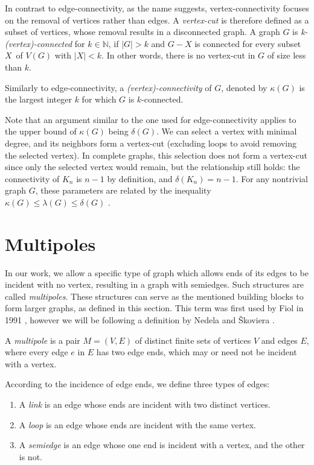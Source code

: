 \documentclass[12pt, twoside]{book}
\begin{document}
In contrast to edge-connectivity, as the name suggests, vertex-connectivity focuses on the removal of vertices rather than edges. A \textit{vertex-cut} is therefore defined as a subset of vertices, whose removal results in a disconnected graph. A graph $G$ is \textit{k-(vertex)-connected} for $k\in\mathbb{N}$, if $|G|>k$ and $G-X$ is connected for every subset $X$~of $V(G)$ with $|X|<k$. In other words, there is no vertex-cut in $G$ of size less than $k$.

Similarly to edge-connectivity, a \textit{(vertex)-connectivity} of $G$, denoted by $\kappa(G)$ is the largest integer $k$ for which $G$ is $k$-connected.

Note that an argument similar to the one used for edge-connectivity applies to the upper bound of $\kappa(G)$ being $\delta(G)$. We can select a vertex with minimal degree, and its neighbors form a vertex-cut (excluding loops to avoid removing the selected vertex). In complete graphs, this selection does not form a vertex-cut since only the selected vertex would remain, but the relationship still holds: the connectivity of $K_n$ is $n-1$ by definition, and $\delta(K_n)=n-1$. For any nontrivial graph $G$, these parameters are related by the inequality $\kappa(G)\leq \lambda(G) \leq \delta(G)$ \cite{Diestel}.

\section{Multipoles}\label{sec:multipoles}

In our work, we allow a specific type of graph which allows ends of its edges to be incident with no vertex, resulting in a graph with semiedges. Such structures are called \textit{multipoles}. These structures can serve as the mentioned building blocks to form larger graphs, as defined in this section. This term was first used by Fiol in 1991 \cite{Fiol1991}, however we will be following a definition by Nedela and Škoviera \cite{Nedela1996}.

\begin{definition}
	A \textit{multipole} is a pair $M=(V,E)$ of distinct finite sets of vertices $V$ and edges $E$, where every edge $e$ in $E$ has two edge ends, which may or need not be incident with a vertex.
	
	According to the incidence of edge ends, we define three types of edges:
	\begin{enumerate}[nolistsep]
		\item A \textit{link} is an edge whose ends are incident with two distinct vertices.
		\item A \textit{loop} is an edge whose ends are incident with the same vertex.
		\item A \textit{semiedge} is an edge whose one end is incident with a vertex, and the other is not.
	\end{enumerate}
\end{definition}
\end{document}
